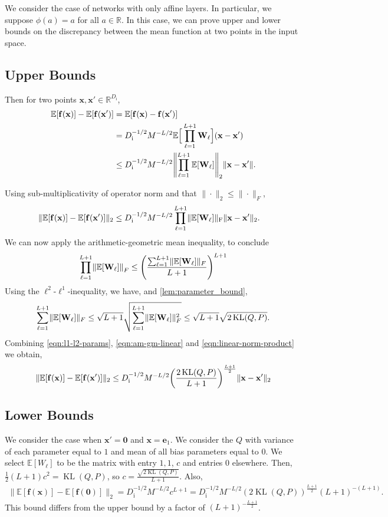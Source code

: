 \documentclass[twoside]{article}
\renewcommand{\ss}[1]{_{\text{#1}}}
\newcommand{\vnull}{\mathbf{0}}
\newcommand{\ve}{\mathbf{e}}
\newcommand{\vf}{\mathbf{f}}
\newcommand{\vx}{\mathbf{x}}
\newcommand{\mW}{\mathbf{W}}
\newcommand{\E}{\mathbb{E}}
\renewcommand{\P}{\mathbb{P}}
\newcommand{\Q}{\mathbb{Q}}
\renewcommand{\Q}{\ensuremath{Q}}
\renewcommand{\P}{\ensuremath{P}}
\newcommand{\R}{\mathbb{R}}
\newcommand{\KL}{\operatorname{KL}}
\renewcommand{\ss}[1]{_{\text{#1}}}        %
\DeclarePairedDelimiter\parens{(}{)}             %
\DeclarePairedDelimiter\norm{\|}{\|}             %
\theoremstyle{theoremstyle}
\begin{document}
We consider the case of networks with only affine layers. In particular, we suppose $\phi(a) = a$ for all $a \in \R$. In this case, we can prove upper and lower bounds on the discrepancy between the mean function at two points in the input space.
\subsection{Upper Bounds}
Then for two points $\vx, \vx' \in \R^{D\ss{i}}$,
\begin{align}
    \E[\vf(\vx)] - \E[\vf(\vx')] & = \E[\vf(\vx) - \vf(\vx')] \\
    & =D\ss{i}^{-1/2}M^{-L/2}\E\Big[\prod_{\ell=1}^{L+1} \mW_\ell\Big](\vx -\vx') \\
    & \leq D\ss{i}^{-1/2}M^{-L/2}\norm*{\prod_{\ell=1}^{L+1} \E[\mW_\ell]}_2\|\vx -\vx'\|.
\end{align}

Using sub-multiplicativity of operator norm and that $\|\cdot \|_2 \leq \| \cdot \|_F$, 
\begin{align}
        \|\E[\vf(\vx)] - \E[\vf(\vx')]\|_2 & \leq D\ss{i}^{-1/2}M^{-L/2}\prod_{\ell=1}^{L+1} \norm{\E[\mW_\ell]}\ss{F}\|\vx -\vx'\|_2. \label{eqn:linear-norm-product}
\end{align}
We can now apply the arithmetic-geometric mean inequality, to conclude 
\begin{align}
    \prod_{\ell=1}^{L+1}\norm*{\E[\mW_\ell]}_F \leq  \parens*{\frac{\sum_{\ell=1}^{L+1} \norm{\E[\mW_\ell]}_F}{L+1}}^{L+1} \label{eqn:am-gm-linear}
\end{align}
Using the $\ell^2$-$\ell^1$-inequality, we have, and \cref{lem:parameter_bound},
\begin{align}
    \sum_{\ell=1}^{L+1} \norm{\E[\mW_\ell]}_F \leq \sqrt{L+1} \sqrt{    \sum_{\ell=1}^{L+1} \norm{\E[\mW_\ell]}_F^2} \leq \sqrt{L+1} \sqrt{2\KL(\Q,\P)}. \label{eqn:l1-l2-params}
\end{align}
Combining \cref{eqn:l1-l2-params}, \cref{eqn:am-gm-linear} and \cref{eqn:linear-norm-product} we obtain,
\begin{align}
     \|\E[\vf(\vx)] - \E[\vf(\vx')]\|_2  \leq D\ss{i}^{-1/2}M^{-L/2}\parens*{\frac{2\KL(\Q,\P)}{L+1}}^{\frac{L+1}{2}}\|\vx -\vx'\|_2
\end{align}
\subsection{Lower Bounds}
We consider the case when $\vx'=\vnull$ and $\vx = \ve_1$. We consider the $\Q$ with variance of each parameter equal to $1$ and mean of all bias parameters equal to $0$. We select $\E[W_\ell]$ to be the matrix with entry $1,1$, $c$ and entries $0$ elsewhere. Then, $\frac{1}{2}(L+1)c^2 = \KL(\Q,\P)$, so $c=\frac{\sqrt{2\KL(\Q,\P)}}{L+1}$. Also, 
\begin{align}
       \|\E[\vf(\vx)] - \E[\vf(\vnull)]\|_2 = D\ss{i}^{-1/2}M^{-L/2}c^{L+1} = D\ss{i}^{-1/2}M^{-L/2}(2\KL(\Q,\P))^{\frac{L+1}{2}}(L+1)^{-(L+1)}.
\end{align}
This bound differs from the upper bound by a factor of $(L+1)^{-\frac{L+1}{2}}$.
\end{document}
